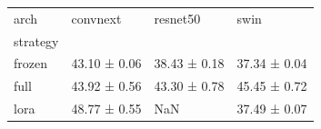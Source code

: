 \begin{tabular}{llll}
\toprule
arch & convnext & resnet50 & swin \\
strategy &  &  &  \\
\midrule
frozen & 43.10 ± 0.06 & 38.43 ± 0.18 & 37.34 ± 0.04 \\
full & 43.92 ± 0.56 & 43.30 ± 0.78 & 45.45 ± 0.72 \\
lora & 48.77 ± 0.55 & NaN & 37.49 ± 0.07 \\
\bottomrule
\end{tabular}
